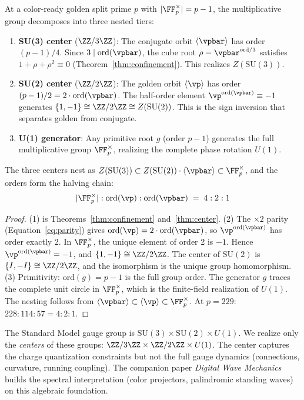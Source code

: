 \begin{theorem}\label{thm:gauge}
At a color-ready golden split prime $p$ with $|{\FF_p^\times}| = p - 1$, the multiplicative group decomposes into three nested tiers:
\begin{enumerate}
\item \textbf{SU(3) center} ($\ZZ/3\ZZ$): The conjugate orbit $\langle\vpbar\rangle$ has order $(p-1)/4$. Since $3 \mid \mathrm{ord}(\vpbar)$, the cube root $\rho = \vpbar^{\mathrm{ord}/3}$ satisfies $1 + \rho + \rho^2 \equiv 0$ (Theorem~\ref{thm:confinement}). This realizes $Z(\mathrm{SU}(3))$.
\item \textbf{SU(2) center} ($\ZZ/2\ZZ$): The golden orbit $\langle\vp\rangle$ has order $(p-1)/2 = 2 \cdot \mathrm{ord}(\vpbar)$. The half-order element $\vp^{\mathrm{ord}(\vpbar)} \equiv -1$ generates $\{1, -1\} \cong \ZZ/2\ZZ \cong Z(\mathrm{SU}(2))$. This is the sign inversion that separates golden from conjugate.
\item \textbf{U(1) generator}: Any primitive root $g$ (order $p - 1$) generates the full multiplicative group $\FF_p^\times$, realizing the complete phase rotation $U(1)$.
\end{enumerate}
The three centers nest as $Z(\mathrm{SU}(3)) \subset Z(\mathrm{SU}(2)) \cdot \langle\vpbar\rangle \subset \FF_p^\times$, and the orders form the halving chain:
$$|{\FF_p^\times}| : \mathrm{ord}(\vp) : \mathrm{ord}(\vpbar) \;=\; 4 : 2 : 1$$
\end{theorem}

\begin{proof}
(1) is Theorems~\ref{thm:confinement} and~\ref{thm:center}. (2) The $\times 2$ parity (Equation~\ref{eq:parity}) gives $\mathrm{ord}(\vp) = 2 \cdot \mathrm{ord}(\vpbar)$, so $\vp^{\mathrm{ord}(\vpbar)}$ has order exactly 2. In $\FF_p^\times$, the unique element of order 2 is $-1$. Hence $\vp^{\mathrm{ord}(\vpbar)} = -1$, and $\{1, -1\} \cong \ZZ/2\ZZ$. The center of $\mathrm{SU}(2)$ is $\{I, -I\} \cong \ZZ/2\ZZ$, and the isomorphism is the unique group homomorphism. (3) Primitivity: $\mathrm{ord}(g) = p - 1$ is the full group order. The generator $g$ traces the complete unit circle in $\FF_p^\times$, which is the finite-field realization of $U(1)$. The nesting follows from $\langle\vpbar\rangle \subset \langle\vp\rangle \subset \FF_p^\times$. At $p = 229$: $228 : 114 : 57 = 4 : 2 : 1$. \qedhere
\end{proof}

\begin{remark}
The Standard Model gauge group is $\mathrm{SU}(3) \times \mathrm{SU}(2) \times U(1)$. We realize only the \emph{centers} of these groups: $\ZZ/3\ZZ \times \ZZ/2\ZZ \times U(1)$. The center captures the charge quantization constraints but not the full gauge dynamics (connections, curvature, running coupling). The companion paper \emph{Digital Wave Mechanics} builds the spectral interpretation (color projectors, palindromic standing waves) on this algebraic foundation.
\end{remark}

